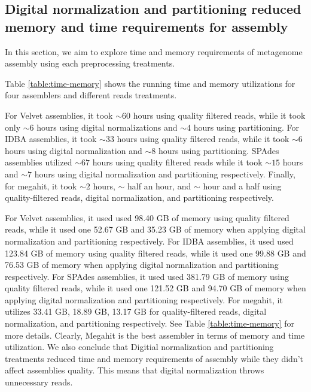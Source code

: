 \subsection*{Digital normalization and partitioning reduced memory and time requirements for assembly}
In this section, we aim to explore time and memory requirements of  metagenome assembly using each preprocessing treatments.  

Table \ref {table:time-memory}  shows the  running time and memory utilizations for four assemblers and different reads treatments.
 

For Velvet assemblies, it  took $\sim 60$ hours using quality filtered reads, while it took only  $\sim 6$ hours using digital normalizations and  $\sim 4$ hours using partitioning.  For IDBA assemblies, it took $\sim 33$ hours using quality filtered reads, while it took $\sim 6$ hours using digital normalization and $\sim 8$ hours using partitioning. SPAdes assemblies utilized $\sim 67$ hours using quality filtered reads  while it took $\sim15$ hours and $\sim 7$ hours using digital normalization and partitioning respectively. Finally, for megahit, it  took $\sim 2$ hours, $\sim$ half an hour, and $\sim$ hour and a half using quality-filtered reads, digital normalization, and partitioning respectively. 
 

For Velvet assemblies, it used used 98.40 GB of memory using quality filtered reads, while it used one 52.67 GB and  35.23 GB of memory when applying digital normalization and partitioning respectively. For IDBA assemblies, it used used 123.84 GB of memory using quality filtered reads, while it used one 99.88 GB and 76.53 GB of memory when applying digital normalization and partitioning respectively. For SPAdes assemblies, it used used 381.79 GB of memory using quality filtered reads, while it used one 121.52 GB and 94.70 GB of memory when applying digital normalization and partitioning respectively.  For megahit, it utilizes 33.41 GB, 18.89 GB,  13.17 GB for quality-filtered reads, digital normalization, and partitioning respectively. See Table \ref{table:time-memory} for more details. 
Clearly, Megahit is the best assembler in terms of memory and time utilization. We also conclude that Digitial normalization and partitioning treatments reduced time and memory requirements of assembly while they didn't affect assemblies quality. This means that digital normalization throws unnecessary reads. 

